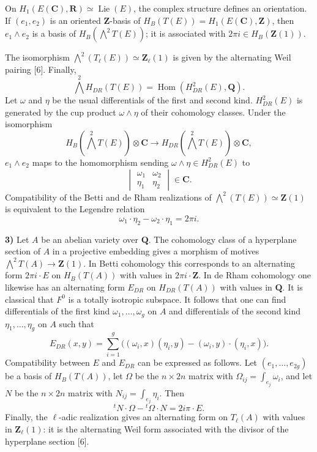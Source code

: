 \documentclass[10pt,a4paper]{article}
\newcommand{\Z}{\mathbf Z}
\newcommand{\Q}{\mathbf Q}
\newcommand{\R}{\mathbf R}
\newcommand{\C}{\mathbf C}
\begin{document}
On $H_1(E(\C),\R)\simeq\operatorname{Lie}(E)$, the complex structure defines an orientation. If $(e_1,e_2)$ is an oriented $\Z$-basis of $H_B(T(E))=H_1(E(\C),\Z)$, then $e_1\wedge e_2$ is a basis of $H_B(\bigwedge^2T(E))$; it is associated with $2\pi i\in H_B(\Z(1))$.

The isomorphism $\bigwedge^2(T_\ell(E))\simeq\Z_\ell(1)$ is given by the alternating Weil pairing [6]. Finally,
\[
\bigwedge^2H_{DR}(T(E))=\operatorname{Hom}(H^2_{DR}(E),\Q).
\]
Let $\omega$ and $\eta$ be the usual differentials of the first and second kind. $H^2_{DR}(E)$ is generated by the cup product $\omega\wedge\eta$ of their cohomology classes. Under the isomorphism
\[
H_B(\bigwedge^2T(E))\otimes\C\longrightarrow H_{DR}(\bigwedge^2T(E))\otimes\C,
\]
$e_1\wedge e_2$ maps to the homomorphism sending $\omega\wedge\eta\in H^2_{DR}(E)$ to
\[
\begin{vmatrix}\omega_1&\omega_2\\\eta_1&\eta_2\end{vmatrix}\in\C.
\]
Compatibility of the Betti and de Rham realizations of $\bigwedge^2(T(E))\simeq\Z(1)$ is equivalent to the Legendre relation
\[
\omega_1\cdot\eta_2-\omega_2\cdot\eta_1=2\pi i.
\]


\newpage


\textbf{3)} Let $A$ be an abelian variety over $\Q$. The cohomology class of a hyperplane section of $A$ in a projective embedding gives a morphism of motives $\bigwedge^2T(A)\to\Z(1)$. In Betti cohomology this corresponds to an alternating form $2\pi i\cdot E$ on $H_B(T(A))$ with values in $2\pi i\cdot\Z$. In de Rham cohomology one likewise has an alternating form $E_{DR}$ on $H_{DR}(T(A))$ with values in $\Q$. It is classical that $F^0$ is a totally isotropic subspace. It follows that one can find differentials of the first kind $\omega_1,\ldots,\omega_g$ on $A$ and differentials of the second kind $\eta_1,\ldots,\eta_g$ on $A$ such that
\[
E_{DR}(x,y)=\sum_{i=1}^g\bigl((\omega_i,x)(\eta_i,y)-(\omega_i,y)\cdot(\eta_i,x)\bigr).
\]
Compatibility between $E$ and $E_{DR}$ can be expressed as follows. Let $(e_1,\ldots,e_{2g})$ be a basis of $H_B(T(A))$, let $\Omega$ be the $n\times2n$ matrix with $\Omega_{ij}=\int_{e_j}\omega_i$, and let $N$ be the $n\times2n$ matrix with $N_{ij}=\int_{e_j}\eta_i$. Then
\[
{}^tN\cdot\Omega-{}^t\Omega\cdot N=2i\pi\cdot E.
\]
Finally, the $\ell$-adic realization gives an alternating form on $T_\ell(A)$ with values in $\Z_\ell(1)$: it is the alternating Weil form associated with the divisor of the hyperplane section [6].
\end{document}
